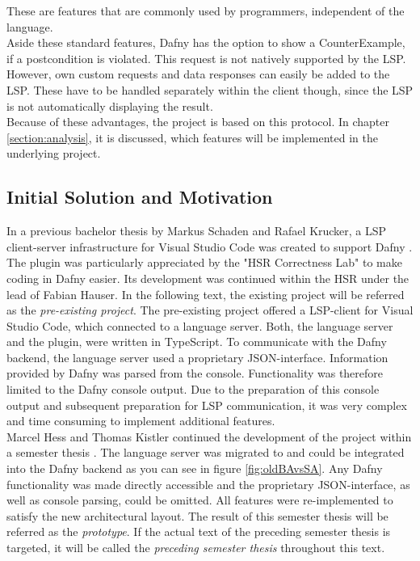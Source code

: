 These are features that are commonly used by programmers, independent of the language.\\

Aside these standard features, Dafny has the option to show a CounterExample, if a postcondition is violated.
This request is not natively supported by the LSP.
However, own custom requests and data responses can easily be added to the LSP.
These have to be handled separately within the client though, since the LSP is not automatically displaying the result. \\

Because of these advantages, the project is based on this protocol.
In chapter \ref{section:analysis}, it is discussed, which features will be implemented in the underlying project.

\subsection{Initial Solution and Motivation}
\label{section:introduction:initialsolution}
In a previous bachelor thesis by Markus Schaden and Rafael Krucker, a LSP client-server infrastructure for Visual Studio Code was created to support Dafny \cite{ba}.
The plugin was particularly appreciated by the "HSR Correctness Lab" \cite{correctnessLab} to make coding in Dafny easier.
Its development was continued within the HSR under the lead of Fabian Hauser.
In the following text, the existing project will be referred as the \textit{pre-existing project}.
The pre-existing project offered a LSP-client for Visual Studio Code, which connected to a language server.
Both, the language server and the plugin, were written in TypeScript.
To communicate with the Dafny backend, the language server used a proprietary JSON-interface.
Information provided by Dafny was parsed from the console.
Functionality was therefore limited to the Dafny console output.
Due to the preparation of this console output and subsequent preparation for LSP communication,
it was very complex and time consuming to implement additional features. \\

Marcel Hess and Thomas Kistler continued the development of the project within a semester thesis \cite{sa}.
The language server was migrated to \CsharpWithSpace and could be integrated into the Dafny backend
as you can see in figure \ref{fig:oldBAvsSA}.
Any Dafny functionality was made directly accessible and the proprietary JSON-interface, as well as console parsing, could be omitted.
All features were re-implemented to satisfy the new architectural layout.
The result of this semester thesis will be referred as the \textit{prototype}.
If the actual text of the preceding semester thesis is targeted, it will be called the \textit{preceding semester thesis} throughout this text.

